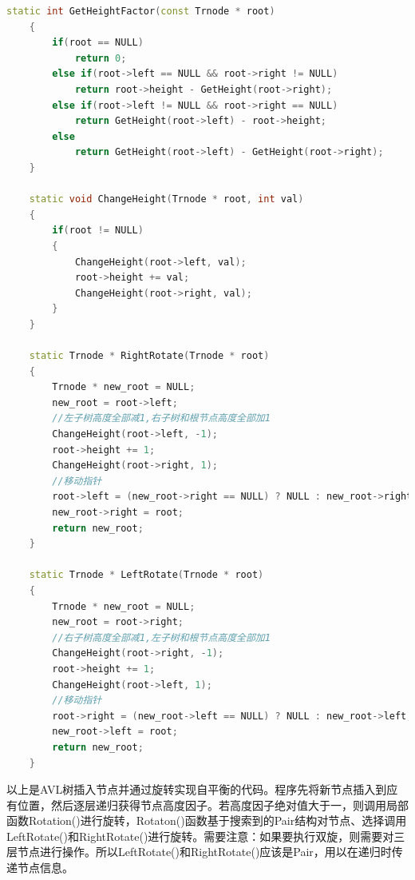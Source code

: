 \documentclass[12pt, a4paper, oneside]{ctexart}
\begin{document}
\begin{framed}
\begin{lstlisting}[language=C++]
    static int GetHeightFactor(const Trnode * root)
    {   
        if(root == NULL)
            return 0;
        else if(root->left == NULL && root->right != NULL)
            return root->height - GetHeight(root->right);
        else if(root->left != NULL && root->right == NULL)
            return GetHeight(root->left) - root->height;
        else
            return GetHeight(root->left) - GetHeight(root->right);
    }
    
    static void ChangeHeight(Trnode * root, int val)
    {
        if(root != NULL)
        {
            ChangeHeight(root->left, val);
            root->height += val;
            ChangeHeight(root->right, val);
        }
    }
    
    static Trnode * RightRotate(Trnode * root)
    {   
        Trnode * new_root = NULL;
        new_root = root->left;
        //左子树高度全部减1,右子树和根节点高度全部加1
        ChangeHeight(root->left, -1);
        root->height += 1;
        ChangeHeight(root->right, 1);
        //移动指针
        root->left = (new_root->right == NULL) ? NULL : new_root->right;
        new_root->right = root;
        return new_root;
    }
    
    static Trnode * LeftRotate(Trnode * root)
    {   
        Trnode * new_root = NULL;
        new_root = root->right;
        //右子树高度全部减1,左子树和根节点高度全部加1
        ChangeHeight(root->right, -1);
        root->height += 1;
        ChangeHeight(root->left, 1);
        //移动指针
        root->right = (new_root->left == NULL) ? NULL : new_root->left;
        new_root->left = root;
        return new_root;
    }
\end{lstlisting}
\end{framed}
以上是AVL树插入节点并通过旋转实现自平衡的代码。程序先将新节点插入到应有位置，然后逐层递归获得节点高度因子。若高度因子绝对值大于一，则调用局部函数Rotation()进行旋转，Rotaton()函数基于搜索到的Pair结构对节点、选择调用LeftRotate()和RightRotate()进行旋转。需要注意：如果要执行双旋，则需要对三层节点进行操作。所以LeftRotate()和RightRotate()应该是Pair，用以在递归时传递节点信息。
\end{document}
